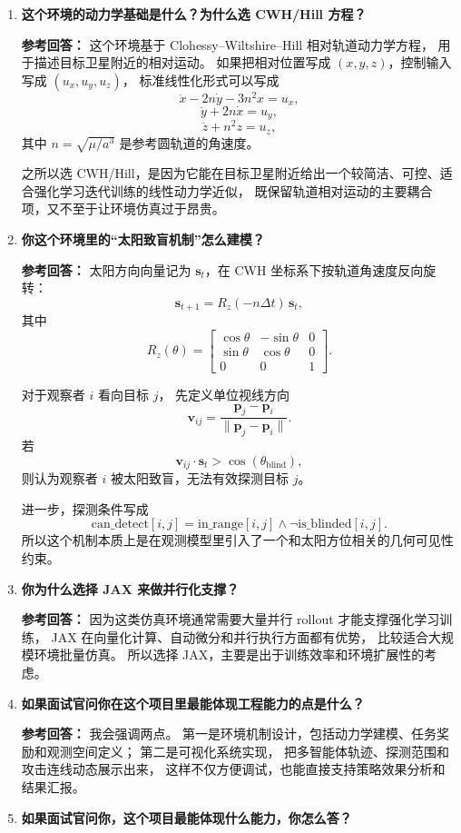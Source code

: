 \documentclass[11pt,a4paper]{ctexart}
\begin{document}
\begin{enumerate}[leftmargin=*, label=\textbf{Q\arabic*.}]

\item \textbf{这个环境的动力学基础是什么？为什么选 CWH/Hill 方程？}

\textbf{参考回答：}
这个环境基于 Clohessy--Wiltshire--Hill 相对轨道动力学方程，
用于描述目标卫星附近的相对运动。
如果把相对位置写成 $(x,y,z)$，控制输入写成 $(u_x,u_y,u_z)$，
标准线性化形式可以写成
\[
\ddot{x} - 2n\dot{y} - 3n^2x = u_x,
\]
\[
\ddot{y} + 2n\dot{x} = u_y,
\]
\[
\ddot{z} + n^2 z = u_z,
\]
其中 $n=\sqrt{\mu/a^3}$ 是参考圆轨道的角速度。

之所以选 CWH/Hill，是因为它能在目标卫星附近给出一个较简洁、可控、适合强化学习迭代训练的线性动力学近似，
既保留轨道相对运动的主要耦合项，又不至于让环境仿真过于昂贵。

\item \textbf{你这个环境里的“太阳致盲机制”怎么建模？}

\textbf{参考回答：}
太阳方向向量记为 $\bm s_t$，在 CWH 坐标系下按轨道角速度反向旋转：
\[
\bm s_{t+1}
=
R_z(-n\Delta t)\,\bm s_t,
\]
其中
\[
R_z(\theta)
=
\begin{bmatrix}
\cos\theta & -\sin\theta & 0\\
\sin\theta & \cos\theta & 0\\
0 & 0 & 1
\end{bmatrix}.
\]

对于观察者 $i$ 看向目标 $j$，
先定义单位视线方向
\[
\bm v_{ij}
=
\frac{\bm p_j-\bm p_i}{\|\bm p_j-\bm p_i\|}.
\]
若
\[
\bm v_{ij}\cdot \bm s_t > \cos(\theta_{\text{blind}}),
\]
则认为观察者 $i$ 被太阳致盲，无法有效探测目标 $j$。

进一步，探测条件写成
\[
\text{can\_detect}[i,j]
=
\text{in\_range}[i,j]\wedge \neg \text{is\_blinded}[i,j].
\]
所以这个机制本质上是在观测模型里引入了一个和太阳方位相关的几何可见性约束。

\item \textbf{你为什么选择 JAX 来做并行化支撑？}

\textbf{参考回答：}
因为这类仿真环境通常需要大量并行 rollout 才能支撑强化学习训练，
JAX 在向量化计算、自动微分和并行执行方面都有优势，
比较适合大规模环境批量仿真。
所以选择 JAX，主要是出于训练效率和环境扩展性的考虑。

\item \textbf{如果面试官问你在这个项目里最能体现工程能力的点是什么？}

\textbf{参考回答：}
我会强调两点。
第一是环境机制设计，包括动力学建模、任务奖励和观测空间定义；
第二是可视化系统实现，
把多智能体轨迹、探测范围和攻击连线动态展示出来，
这样不仅方便调试，也能直接支持策略效果分析和结果汇报。
\item \textbf{如果面试官问你，这个项目最能体现什么能力，你怎么答？}


\end{enumerate}
\end{document}
